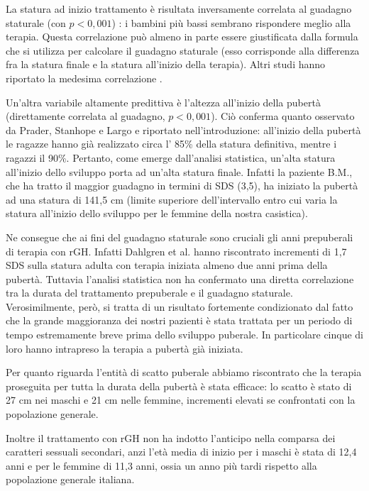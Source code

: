 La statura ad inizio trattamento è risultata inversamente correlata al guadagno staturale (con $p < 0,001$) : i bambini più bassi sembrano rispondere meglio alla terapia. Questa correlazione può almeno in parte essere giustificata dalla formula che si utilizza per calcolare il guadagno staturale (esso corrisponde alla differenza fra la statura finale e la statura all'inizio della terapia). Altri studi hanno riportato la medesima correlazione\cite{de2005growth} \cite{de2000growth}.

Un'altra variabile altamente predittiva è l'altezza all'inizio della pubertà (direttamente correlata al guadagno, $p < 0,001$). Ciò conferma quanto osservato da Prader\cite{gasser1985human}, Stanhope\cite{stanhope1988new} e Largo \cite{gasser2001growth} e riportato nell'introduzione: 
 all'inizio della pubertà le ragazze hanno già realizzato circa l' 85\% della statura definitiva, mentre i ragazzi il 90\%. Pertanto, come emerge dall'analisi statistica, un'alta statura all'inizio dello sviluppo porta ad un'alta statura finale. Infatti la paziente B.M., che ha tratto il maggior guadagno in termini di SDS (3,5), ha iniziato la pubertà ad una statura di 141,5 cm (limite superiore dell'intervallo entro cui varia la statura all'inizio dello sviluppo per le femmine della nostra casistica).
 
Ne consegue che ai fini del guadagno staturale sono cruciali gli anni prepuberali di terapia con rGH. Infatti Dahlgren et al. hanno riscontrato incrementi di 1,7 SDS sulla statura adulta con terapia iniziata almeno due anni prima della pubertà\cite{dahlgren2005final}. Tuttavia l'analisi statistica non ha confermato una diretta correlazione tra la durata del trattamento prepuberale e il guadagno staturale. Verosimilmente, però, si tratta di un risultato fortemente condizionato dal fatto che la grande maggioranza dei nostri pazienti è stata trattata per un periodo di tempo estremamente breve prima dello sviluppo puberale. In particolare cinque di loro hanno intrapreso la terapia a pubertà già iniziata.

Per quanto riguarda l'entità di scatto puberale abbiamo riscontrato che la terapia proseguita per tutta la durata della pubertà è stata efficace: lo scatto è stato di 27 cm nei maschi e 21 cm nelle femmine, incrementi elevati se confrontati con la popolazione generale\cite{tanner1990foetus}. 

Inoltre il trattamento con rGH non ha indotto l'anticipo nella comparsa dei caratteri sessuali secondari, anzi l'età media di inizio per i maschi è stata di 12,4 anni e per le femmine di 11,3 anni, ossia un anno più tardi rispetto alla popolazione generale italiana\cite{benso1989distribution}.

